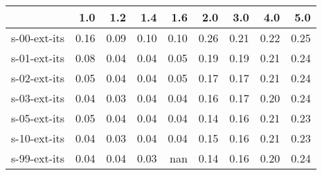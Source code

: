 \begin{tabular}{lrrrrrrrr}
\toprule
{} &  1.0 &  1.2 &  1.4 &  1.6 &  2.0 &  3.0 &  4.0 &  5.0 \\
\midrule
s-00-ext-its & 0.16 & 0.09 & 0.10 & 0.10 & 0.26 & 0.21 & 0.22 & 0.25 \\
s-01-ext-its & 0.08 & 0.04 & 0.04 & 0.05 & 0.19 & 0.19 & 0.21 & 0.24 \\
s-02-ext-its & 0.05 & 0.04 & 0.04 & 0.05 & 0.17 & 0.17 & 0.21 & 0.24 \\
s-03-ext-its & 0.04 & 0.03 & 0.04 & 0.04 & 0.16 & 0.17 & 0.20 & 0.24 \\
s-05-ext-its & 0.05 & 0.04 & 0.04 & 0.04 & 0.14 & 0.16 & 0.21 & 0.23 \\
s-10-ext-its & 0.04 & 0.03 & 0.04 & 0.04 & 0.15 & 0.16 & 0.21 & 0.23 \\
s-99-ext-its & 0.04 & 0.04 & 0.03 &  nan & 0.14 & 0.16 & 0.20 & 0.24 \\
\bottomrule
\end{tabular}
